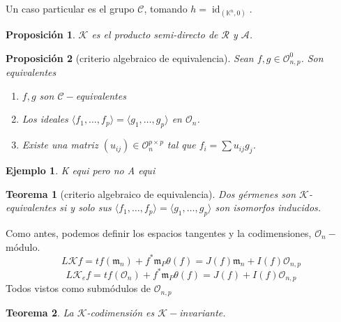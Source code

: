\documentclass[12pt]{book}
\newtheorem{eje}{Ejemplo}
\newtheorem{teo}{Teorema}
\newtheorem{pro}{Proposición}
\newcommand{\rg}{\mathcal{R}}
\newcommand{\kg}{\mathcal{K}}
\newcommand{\ag}{\mathcal{A}}
\newcommand{\oo}{\mathcal{O}_n}
\newcommand{\mm}{\mathfrak{m}_n}
\newcommand{\kn}{(\mathbb{K}^n,0)}
\begin{document}

Un caso particular es el grupo $\mathcal{C}$, tomando $h= \operatorname{id}_{\kn}$. 

\begin{pro}
$\kg$ es el producto semi-directo de $\rg$ y $\ag$.
\end{pro}

\begin{pro}[criterio algebraico de equivalencia]
Sean $ f,g \in \mathcal{O}_{n,p} ^0$. Son equivalentes
\begin{enumerate}
\item $f,g$ son $\mathcal{C}-$equivalentes
\item Los ideales $\langle f_1, \ldots, f_p  \rangle = \langle g_1, \ldots, g_p  \rangle$ en $\oo$.
\item Existe una matriz $(u_{ij})\in \oo ^{p\times p} $  tal que $f_i= \sum u_{ij} g_j$. 
\end{enumerate}
\end{pro} 


\begin{eje}
K equi pero no A equi
\end{eje}

\begin{teo}[criterio algebraico de equivalencia]
Dos gérmenes son $\kg$-equivalentes si y solo sus $\langle f_1, \ldots, f_p  \rangle = \langle g_1, \ldots, g_p  \rangle$ son isomorfos inducidos.
\end{teo}

Como antes, podemos definir los espacios tangentes y la codimensiones, $\mathcal{O}_n-$módulo.
$$ L \mathcal{K} f = tf (\mm) + f^* \mathfrak{m}_P\theta(f) = J(f) \mm + I(f) \mathcal{O}_{n,p}  $$
$$ L \mathcal{K}_e f = tf (\oo) + f^* \mathfrak{m}_P\theta(f) = J(f)  + I(f) \mathcal{O}_{n,p}  $$
Todos vistos como submódulos de $\mathcal{O}_{n,p}$




\begin{teo}
La $\kg$-codimensión es $\kg-$invariante.
\end{teo}


\end{document}
